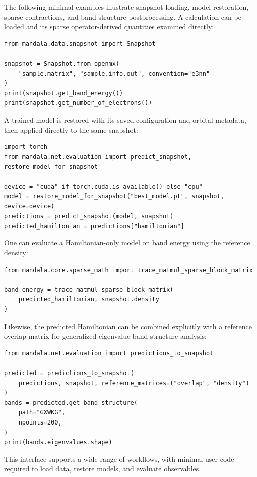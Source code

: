 \documentclass[preprint,12pt,compress,numafflabel]{elsarticle}
\begin{document}
The following minimal examples illustrate snapshot loading, model restoration, sparse contractions, and band-structure postprocessing. A calculation can be loaded and its sparse operator-derived quantities examined directly:

\begin{lstlisting}
from mandala.data.snapshot import Snapshot

snapshot = Snapshot.from_openmx(
    "sample.matrix", "sample.info.out", convention="e3nn"
)
print(snapshot.get_band_energy())
print(snapshot.get_number_of_electrons())
\end{lstlisting}

A trained model is restored with its saved configuration and orbital metadata, then applied directly to the same snapshot:

\begin{lstlisting}
import torch
from mandala.net.evaluation import predict_snapshot, restore_model_for_snapshot

device = "cuda" if torch.cuda.is_available() else "cpu"
model = restore_model_for_snapshot("best_model.pt", snapshot, device=device)
predictions = predict_snapshot(model, snapshot)
predicted_hamiltonian = predictions["hamiltonian"]
\end{lstlisting}

One can evaluate a Hamiltonian-only model on band energy using the reference density:

\begin{lstlisting}
from mandala.core.sparse_math import trace_matmul_sparse_block_matrix

band_energy = trace_matmul_sparse_block_matrix(
    predicted_hamiltonian, snapshot.density
)
\end{lstlisting}

Likewise, the predicted Hamiltonian can be combined explicitly with a reference overlap matrix for generalized-eigenvalue band-structure analysis:

\begin{lstlisting}
from mandala.net.evaluation import predictions_to_snapshot

predicted = predictions_to_snapshot(
    predictions, snapshot, reference_matrices=("overlap", "density")
)
bands = predicted.get_band_structure(
    path="GXWKG",
    npoints=200,
)
print(bands.eigenvalues.shape)
\end{lstlisting}

This interface supports a wide range of workflows, with minimal user code required to load data, restore models, and evaluate observables.
\end{document}
